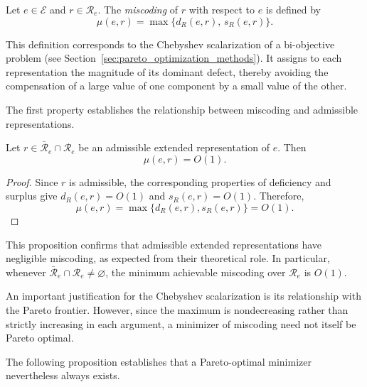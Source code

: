 \begin{definition}
\label{def:scalar_miscoding}
Let $e\in\mathcal E$ and $r\in\mathcal R_e$. The \emph{miscoding} of $r$ with respect to $e$ is defined by
\[
\mu(e,r) = \max\bigl\{d_R(e,r),\,s_R(e,r)\bigr\}.
\]
\end{definition}

This definition corresponds to the Chebyshev scalarization of a bi-objective problem (see Section~\ref{sec:pareto_optimization_methods}). It assigns to each representation the magnitude of its dominant defect, thereby avoiding the compensation of a large value of one component by a small value of the other.

The first property establishes the relationship between miscoding and admissible representations.

\begin{proposition}
\label{prop:miscoding_admissible}
Let $r\in\bar{\mathcal R}_e\cap\mathcal R_e$ be an admissible extended representation of $e$. Then
\[
\mu(e,r)=O(1).
\]
\end{proposition}
\begin{proof}
Since $r$ is admissible, the corresponding properties of deficiency and surplus give $d_R(e,r)=O(1)$ and $s_R(e,r)=O(1)$. Therefore,
\[
\mu(e,r) = \max\{d_R(e,r),s_R(e,r)\} = O(1).
\]
\end{proof}

This proposition confirms that admissible extended representations have negligible miscoding, as expected from their theoretical role. In particular, whenever $\bar{\mathcal R}_e\cap\mathcal R_e\neq\varnothing$, the minimum achievable miscoding over $\mathcal R_e$ is $O(1)$.

An important justification for the Chebyshev scalarization is its relationship with the Pareto frontier. However, since the maximum is nondecreasing rather than strictly increasing in each argument, a minimizer of miscoding need not itself be Pareto optimal.

The following proposition establishes that a Pareto-optimal minimizer nevertheless always exists.

